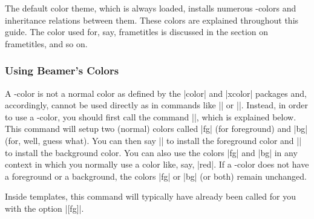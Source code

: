 The default color theme, which is always loaded, installs numerous
\beamer-colors and inheritance relations between them. These colors
are explained throughout this guide. The color used for, say,
frametitles is discussed in the section on frametitles, and so on.  


\subsubsection{Using Beamer's Colors}

A \beamer-color is not a normal color as defined by the |color| and
|xcolor| packages and, accordingly, cannot be used directly as in
commands like |\color| or ||. Instead, in order to use a
\beamer-color, you should first call the command |\usebeamercolor|,
which is explained below. This command will setup two (normal) colors
called |fg| (for foreground) and |bg| (for, well, guess what). You can
then say |\color{fg}| to install the foreground color and
|\color{bg}| to install the background color. You can also use the
colors |fg| and |bg| in any context in which you normally use a color
like, say, |red|. If a \beamer-color does not have a foreground or a
background, the colors |fg| or |bg| (or both) remain unchanged. 

Inside templates, this command will typically have already been called
for you with the option |[fg]|. 

